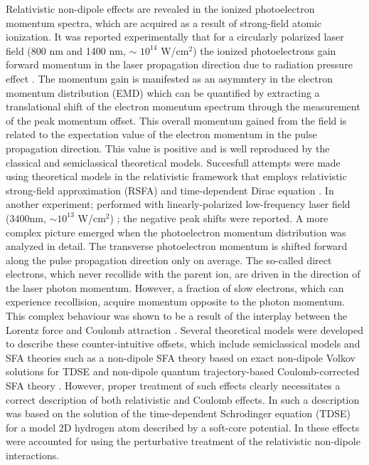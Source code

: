 \documentclass[aps,prl,twocolumn,superscriptaddress,amsmath,amssymb]{revtex4-1}
\begin{document}
Relativistic non-dipole effects are revealed in the ionized photoelectron momentum spectra, which are acquired as a result of strong-field atomic ionization. It was reported experimentally that for a circularly polarized laser field (800 nm and 1400 nm, $\sim$ $10^{14}$ W/cm$^{2}$) the ionized photoelectrons gain forward momentum in the laser propagation direction due to radiation pressure effect \cite{Smeenk2011}. The momentum gain is manifested as an asymmtery in the electron momentum distribution (EMD) which can be quantified by extracting a translational shift of the electron momentum spectrum through the measurement of the peak momentum offset. This overall momentum gained from the field is related to the expectation value of the electron momentum in the pulse propagation direction. This value is positive and is well reproduced by the classical \cite{Smeenk2011} and semiclassical \cite{Titi2012} theoretical models. Succesfull attempts were made using theoretical models in the relativistic framework that employs relativistic strong-field approximation (RSFA) \cite{Reiss2013,Yakaboylu2013} and time-dependent Dirac equation \cite{Ivanov2015}. In another experiment; performed with linearly-polarized low-frequency laser field (3400nm, $\sim10^{13}$ W/cm$^{2}$) \cite{Ludwig2014}; the negative peak shifts were reported. A more complex picture emerged when the photoelectron momentum distribution was analyzed in detail. The transverse photoelectron momentum  is shifted forward along the pulse propagation direction only on average. The so-called direct  electrons, which never recollide with the parent ion, are driven in the direction of the laser photon momentum. However, a fraction of slow electrons, which can experience recollision, acquire momentum opposite to the photon momentum. This complex behaviour was shown to be a result of the interplay between the Lorentz force and Coulomb attraction \cite{Chelkowski2015}. Several theoretical models were developed to describe these counter-intuitive offsets, which include semiclassical models \cite{Ludwig2014,Tao2017} and SFA theories such as a non-dipole SFA theory based on exact non-dipole Volkov solutions for TDSE \cite{He2017} and non-dipole quantum trajectory-based Coulomb-corrected SFA theory \cite{Keil2017}. However, proper treatment of such effects clearly necessitates a correct description of both relativistic and Coulomb effects. In \cite{Chelkowski2015} such a description was based on the solution of the time-dependent Schr$\ddot{\text{o}}$dinger equation (TDSE) for a model 2D hydrogen atom described by a soft-core potential. In \cite{Ivanov2016a} these effects were accounted for using the perturbative treatment of the relativistic non-dipole interactions. 
\end{document}
